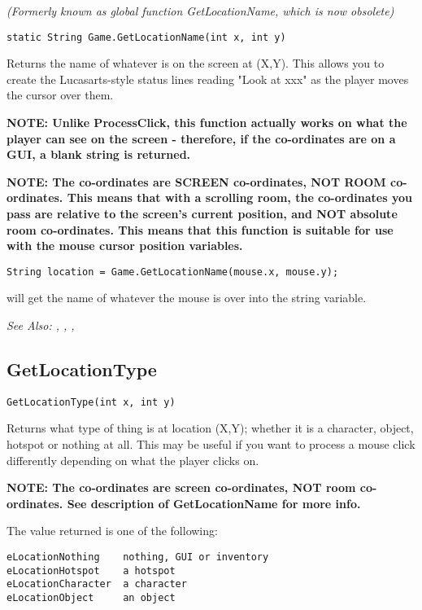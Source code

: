 \it{(Formerly known as global function GetLocationName, which is now obsolete)}

\begin{verbatim}
static String Game.GetLocationName(int x, int y)
\end{verbatim}
Returns the name of whatever is on the screen at (X,Y). This allows you to
create the Lucasarts-style status lines reading "Look at xxx" as the player
moves the cursor over them.

\bf{NOTE:} Unlike ProcessClick, this function actually works on what the player can
see on the screen - therefore, if the co-ordinates are on a GUI, a blank string is returned.

\bf{NOTE:} The co-ordinates are SCREEN co-ordinates, NOT ROOM co-ordinates. This
means that with a scrolling room, the co-ordinates you pass are relative to
the screen's current position, and NOT absolute room co-ordinates. This
means that this function is suitable for use with the mouse cursor position
variables.

\begin{verbatim}
String location = Game.GetLocationName(mouse.x, mouse.y);
\end{verbatim}
will get the name of whatever the mouse is over into the string variable.

\it{See Also:} , ,
, 


\subsection{GetLocationType}\label{GetLocationType}%

\begin{verbatim}
GetLocationType(int x, int y)
\end{verbatim}
Returns what type of thing is at location (X,Y); whether it is a character,
object, hotspot or nothing at all. This may be useful if you want to
process a mouse click differently depending on what the player clicks on.

\bf{NOTE:} The co-ordinates are screen co-ordinates, NOT room co-ordinates. See
description of GetLocationName for more info.

The value returned is one of the following:
\begin{verbatim}
eLocationNothing    nothing, GUI or inventory
eLocationHotspot    a hotspot
eLocationCharacter  a character
eLocationObject     an object
\end{verbatim}

